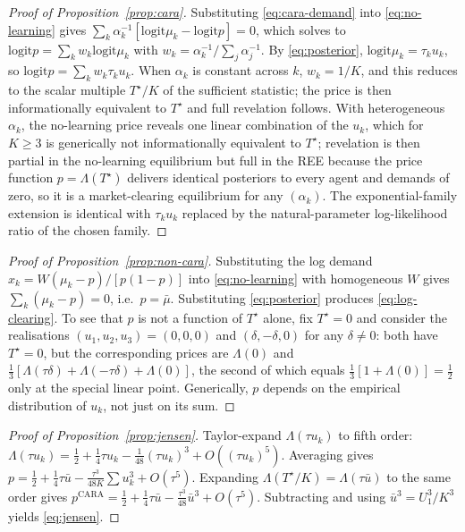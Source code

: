 \documentclass[12pt,letterpaper]{article}
\theoremstyle{definition}
\theoremstyle{remark}
\newcommand{\Lam}{\Lambda}            %
\newcommand{\logit}{\mathrm{logit}}
\newcommand{\Tstar}{T^{\!\star}}
\newcommand{\1}{\mathbf{1}}
\begin{document}
\begin{proof}[Proof of Proposition~\ref{prop:cara}]
Substituting \eqref{eq:cara-demand} into \eqref{eq:no-learning} gives
$\sum_{k}\alpha_{k}^{-1}[\logit\mu_{k}-\logit p]=0$, which solves to
$\logit p=\sum_{k}w_{k}\logit\mu_{k}$ with
$w_{k}=\alpha_{k}^{-1}/\sum_{j}\alpha_{j}^{-1}$. By
\eqref{eq:posterior}, $\logit\mu_{k}=\tau_{k}u_{k}$, so
$\logit p=\sum_{k}w_{k}\tau_{k}u_{k}$. When $\alpha_{k}$ is constant across
$k$, $w_{k}=1/K$, and this reduces to the scalar multiple $\Tstar/K$ of the
sufficient statistic; the price is then informationally equivalent to
$\Tstar$ and full revelation follows. With heterogeneous $\alpha_{k}$,
the no-learning price reveals one linear combination of the $u_{k}$, which
for $K\geq 3$ is generically not informationally equivalent to $\Tstar$;
revelation is then partial in the no-learning equilibrium but full in the
REE because the price function $p=\Lam(\Tstar)$ delivers identical
posteriors to every agent and demands of zero, so it is a market-clearing
equilibrium for any $(\alpha_{k})$. The exponential-family extension is
identical with $\tau_{k}u_{k}$ replaced by the natural-parameter
log-likelihood ratio of the chosen family.
\end{proof}

\begin{proof}[Proof of Proposition~\ref{prop:non-cara}]
Substituting the log demand $x_{k}=W(\mu_{k}-p)/[p(1-p)]$ into
\eqref{eq:no-learning} with homogeneous $W$ gives $\sum_{k}(\mu_{k}-p)=0$,
i.e.\ $p=\bar\mu$. Substituting \eqref{eq:posterior} produces
\eqref{eq:log-clearing}. To see that $p$ is not a function of $\Tstar$
alone, fix $\Tstar=0$ and consider the realisations
$(u_{1},u_{2},u_{3})=(0,0,0)$ and $(\delta,-\delta,0)$ for any
$\delta\neq 0$: both have $\Tstar=0$, but the corresponding prices are
$\Lam(0)$ and $\tfrac13[\Lam(\tau\delta)+\Lam(-\tau\delta)+\Lam(0)]$, the
second of which equals $\tfrac13[1+\Lam(0)]=\tfrac12$ only at the special
linear point. Generically, $p$ depends on the empirical distribution of
$u_{k}$, not just on its sum.
\end{proof}

\begin{proof}[Proof of Proposition~\ref{prop:jensen}]
Taylor-expand $\Lam(\tau u_{k})$ to fifth order:
$\Lam(\tau u_{k})=\tfrac12+\tfrac14\tau u_{k}-\tfrac1{48}(\tau u_{k})^{3}+
O((\tau u_{k})^{5})$. Averaging gives
$p=\tfrac12+\tfrac14\tau\bar u-\tfrac{\tau^{3}}{48 K}\sum u_{k}^{3}+O(\tau^{5})$.
Expanding $\Lam(\Tstar/K)=\Lam(\tau\bar u)$ to the same order gives
$p^{\mathrm{CARA}}=\tfrac12+\tfrac14\tau\bar u-\tfrac{\tau^{3}}{48}\bar u^{3}+
O(\tau^{5})$. Subtracting and using $\bar u^{3}=U_{1}^{3}/K^{3}$ yields
\eqref{eq:jensen}.
\end{proof}
\end{document}
